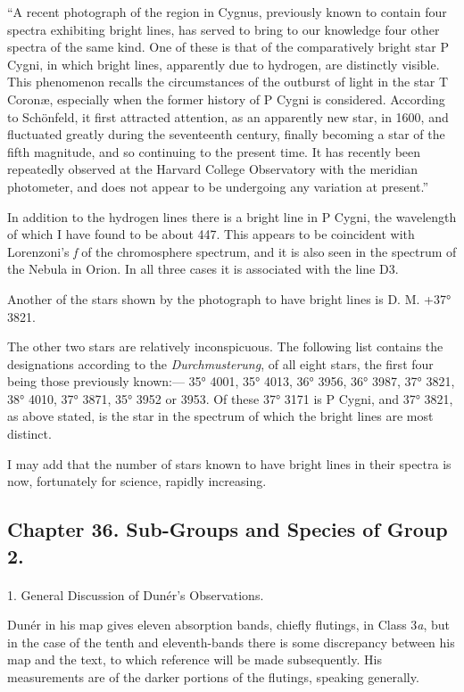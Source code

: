 \documentclass[a4paper, 12pt, oneside, polutonikogreek, english]{article}
\begin{document}
``A recent photograph of the region in Cygnus, previously known to contain four spectra exhibiting bright lines, has served to bring to our knowledge four other spectra of the same kind. One of these is that of the comparatively bright star P Cygni, in which bright lines, apparently due to hydrogen, are distinctly visible. This phenomenon recalls the circumstances of the outburst of light in the star T Coronæ, especially when the former history of P Cygni is considered. According to Schönfeld, it first attracted attention, as an apparently new star, in 1600, and fluctuated greatly during the seventeenth century, finally becoming a star of the fifth magnitude, and so continuing to the present time. It has recently been repeatedly observed at the Harvard College Observatory with the meridian photometer, and does not appear to be undergoing any variation at present.''

In addition to the hydrogen lines there is a bright line in P Cygni, the wavelength of which I have found to be about 447. This appears to be coincident with Lorenzoni's \emph{f} of the chromosphere spectrum, and it is also seen in the spectrum of the Nebula in Orion. In all three cases it is associated with the line D3.

Another of the stars shown by the photograph to have bright lines is D. M. +37° 3821.

The other two stars are relatively inconspicuous. The following list contains the designations according to the \emph{Durchmusterung}, of all eight stars, the first four being those previously known:--- 35° 4001, 35° 4013, 36° 3956, 36° 3987, 37° 3821, 38° 4010, 37° 3871, 35° 3952 or 3953. Of these 37° 3171 is P Cygni, and 37° 3821, as above stated, is the star in the spectrum of which the bright lines are most distinct.

I may add that the number of stars known to have bright lines in their spectra is now, fortunately for science, rapidly increasing.
\clearpage
\subsection{Chapter 36. Sub-Groups and Species of Group 2.}
\paragraph{}
1. General Discussion of Dunér's Observations.

Dunér in his map gives eleven absorption bands, chiefly flutings, in Class 3\emph{a}, but in the case of the tenth and eleventh-bands there is some discrepancy between his map and the text, to which reference will be made subsequently. His measurements are of the darker portions of the flutings, speaking generally.
\end{document}
